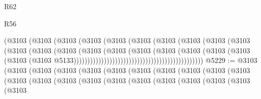 \begin{lexlean}{R62}
\begin{lexlean}{R56}
\begin{coremodule}
{{{{{{{{{{{{{{{{{{{{{{{{{{{{{{{{{{{{{{{{{{{{{{{{{{{{{{{{{{{{{{{{{{{{{{{{{{{{{{{{{{{{{{{{{{{{{{{{{{{{{{{{{{{{{{{{{{{{{{{{{{{{{{{{{{{{{{{{{{{{{{{{{{{{{{{{{{{{{{{{{{{{{{{{{{{{{{{{{{{{{{{{{{{{{{{{{{{{{{{{{{{{{{{{{{{                                                      (@3103
                                                        (@3103
                                                          (@3103
                                                            (@3103
                                                              (@3103
                                                                (@3103
                                                                  (@3103
                                                                    (@3103
                                                                      (@3103
                                                                        (@3103
                                                                          (@3103
                                                                            (@3103
                                                                              (@3103
                                                                                (@3103
                                                                                  (@3103
                                                                                    (@3103
                                                                                      (@3103
                                                                                        (@3103
                                                                                          (@3103
                                                                                            (@3103
                                                                                              (@3103
                                                                                                (@3103
                                                                                                  @5133)))))))))))))))))))))))))))))))))))))))))))))))
@5229 := @3103
    (@3103
      (@3103
        (@3103
          (@3103
            (@3103
              (@3103
                (@3103
                  (@3103
                    (@3103
                      (@3103
                        (@3103
                          (@3103
                            (@3103
                              (@3103
                                (@3103
                                  (@3103
                                    (@3103
                                      (@3103
                                        (@3103
                                          (@3103
                                            (@3103
}}}}}}}}}}}}}}}}}}}}}}}}}}}}}}}}}}}}}}}}}}}}}}}}}}}}}}}}}}}}}}}}}}}}}}}}}}}}}}}}}}}}}}}}}}}}}}}}}}}}}}}}}}}}}}}}}}}}}}}}}}}}}}}}}}}}}}}}}}}}}}}}}}}}}}}}}}}}}}}}}}}}}}}}}}}}}}}}}}}}}}}}}}}}}}}}}}}}}}}}}}}}}}}}}}}
\end{coremodule}
\end{lexlean}
\end{lexlean}
